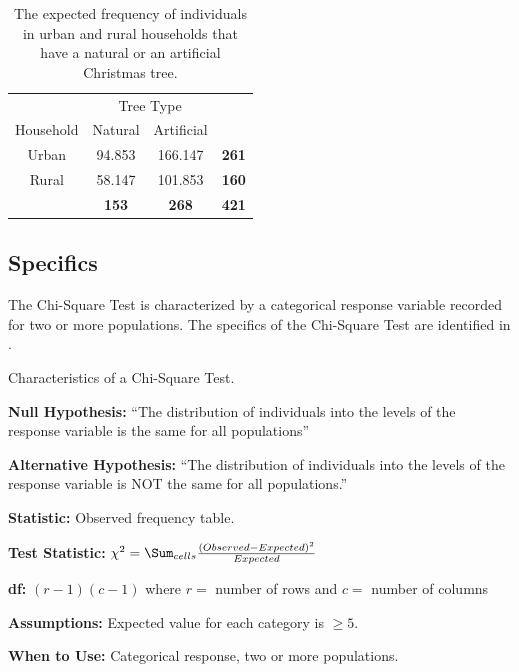 \documentclass[10pt,openany]{book}\usepackage[]{graphicx}\usepackage[]{color}
\begin{document}
\begin{table}[htbp]
  \centering
  \caption{The expected frequency of individuals in urban and rural households that have a natural or an artificial Christmas tree.}\label{tab:ChiTreeExp}
    \begin{tabular}{c|c|c|c|}
      \multicolumn{1}{c}{} & \multicolumn{2}{c}{Tree Type} & \multicolumn{1}{c}{} \\
      \cline{2-3}
      Household & Natural & Artificial & \multicolumn{1}{c}{} \\
      \hline
      \multicolumn{1}{|c|}{Urban} & 94.853 & 166.147 & \textbf{261} \\
      \hline
      \multicolumn{1}{|c|}{Rural} & 58.147 & 101.853 & \textbf{160} \\
      \hline
       & \textbf{153} & \textbf{268} & \textbf{421} \\
      \cline{2-4}
    \end{tabular}
\end{table}


\subsection{Specifics}
\vspace{-12pt}
The Chi-Square Test is characterized by a categorical response variable recorded for two or more populations.  The specifics of the Chi-Square Test are identified in .

\begin{table}[h]
\centering
\colorbox{ltgray}{
\begin{minipage}{.8\textwidth}
  \centering
	\caption{Characteristics of a Chi-Square Test.}\label{tab:Chispec}
  \begin{Itemize}
      \item \textbf{Null Hypothesis:} ``The distribution of individuals into the levels of the response variable is the same for all populations''
      \item \textbf{Alternative Hypothesis:} ``The distribution of individuals into the levels of the response variable is NOT the same for all populations.''
      \item \textbf{Statistic:} Observed frequency table.
      \item \textbf{Test Statistic:} $\chi^{2} = \Sum_{cells}\frac{(Observed-Expected)^{2}}{Expected}$
      \item \textbf{df:} $(r-1)(c-1)$ where $r=$ number of rows and $c=$ number of columns
      \item \textbf{Assumptions:} Expected value for each category is $\geq5$.
      \item \textbf{When to Use:} Categorical response, two or more populations.
  \end{Itemize}
\end{minipage}}
\end{table}
\end{document}
